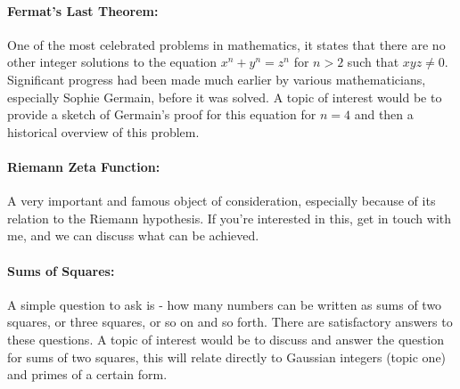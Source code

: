 \documentclass[11pt]{article}
\theoremstyle{plain}
\theoremstyle{definition}
\theoremstyle{remark}
\numberwithin{equation}{section}
\begin{document}
\paragraph{Fermat's Last Theorem:} One of the most celebrated problems in mathematics, it states that there are no other integer solutions to the equation $x^n + y^n = z^n$ for $n > 2$ such that $xyz \neq 0$. Significant progress had been made much earlier by various mathematicians, especially Sophie Germain, before it was solved. A topic of interest would be to provide a sketch of Germain's proof for this equation for $n = 4$ and then a historical overview of this problem.

\paragraph{Riemann Zeta Function:} A very important and famous object of consideration, especially because of its relation to the Riemann hypothesis. If you're interested in this, get in touch with me, and we can discuss what can be achieved.

\paragraph{Sums of Squares:} A simple question to ask is - how many numbers can be written as sums of two squares, or three squares, or so on and so forth. There are satisfactory answers to these questions. A topic of interest would be to discuss and answer the question for sums of two squares, this will relate directly to Gaussian integers (topic one) and primes of a certain form.
\end{document}
